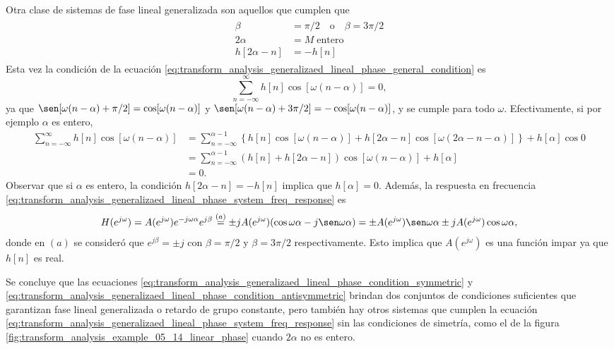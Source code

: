 \documentclass[a4paper]{report}
\begin{document}
Otra clase de sistemas de fase lineal generalizada son aquellos que cumplen que 
\begin{gather}
\begin{aligned}\label{eq:transform_analysis_generalizaed_lineal_phase_condition_antisymmetric}
  \beta&=\pi/2\quad\textrm{o}\quad\beta=3\pi/2\\ 
  2\alpha&=M\;\textrm{entero}\\
  h[2\alpha-n]&=-h[n]
\end{aligned}
\end{gather}
Esta vez la condición de la ecuación \ref{eq:transform_analysis_generalizaed_lineal_phase_general_condition} es
\begin{equation}\label{eq:transform_analysis_generalizaed_lineal_phase_condition_antisymmetric_sum}
  \sum_{n=-\infty}^\infty h[n]\cos[\omega(n-\alpha)]=0, 
\end{equation}
ya que \(\sen[\omega(n-\alpha)+\pi/2]=\cos[\omega(n-\alpha)]\) y \(\sen[\omega(n-\alpha)+3\pi/2]=-\cos[\omega(n-\alpha)]\), y se cumple para todo \(\omega\). Efectivamente, si por ejemplo \(\alpha\) es entero,
\begin{align*}
 \sum_{n=-\infty}^\infty h[n]\cos[\omega(n-\alpha)]&=\sum_{n=-\infty}^{\alpha-1}\left\{h[n]\cos[\omega(n-\alpha)]
  +h[2\alpha-n]\cos[\omega(2\alpha-n-\alpha)]\right\}+h[\alpha]\cos0\\
  &=\sum_{n=-\infty}^{\alpha-1}(h[n]+h[2\alpha-n])\cos[\omega(n-\alpha)]+h[\alpha]\\
  &=0.
\end{align*}
Observar que si \(\alpha\) es entero, la condición \(h[2\alpha-n]=-h[n]\) implica que \(h[\alpha]=0\). Además, la respuesta en frecuencia \ref{eq:transform_analysis_generalizaed_lineal_phase_system_freq_response} es
\[
 H(e^{j\omega})=A(e^{j\omega})e^{-j\omega\alpha}e^{j\beta}
  \overset{(a)}{=}\pm jA(e^{j\omega})(\cos\omega\alpha-j\sen\omega\alpha)
  =\pm A(e^{j\omega})\sen\omega\alpha\pm jA(e^{j\omega})\cos\omega\alpha,
\]
donde en \((a)\) se consideró que \(e^{j\beta}=\pm j\) con \(\beta=\pi/2\) y \(\beta=3\pi/2\) respectivamente. Esto implica que \(A(e^{j\omega})\) es una función impar ya que \(h[n]\) es real. 

Se concluye que las ecuaciones \ref{eq:transform_analysis_generalizaed_lineal_phase_condition_symmetric} y \ref{eq:transform_analysis_generalizaed_lineal_phase_condition_antisymmetric} brindan dos conjuntos de condiciones suficientes que garantizan fase lineal generalizada o retardo de grupo constante, pero también hay otros sistemas que cumplen la ecuación \ref{eq:transform_analysis_generalizaed_lineal_phase_system_freq_response} sin las condiciones de simetría, como el de la figura \ref{fig:transform_analysis_example_05_14_linear_phase} cuando \(2\alpha\) no es entero.
\end{document}
